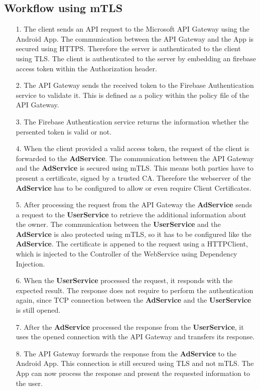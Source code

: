 \subsection{Workflow using mTLS}
\begin{enumerate}
	\item[1.] The client sends an API request to the Microsoft API Gateway using the Android App.
		The communication between the API Gateway and the App is secured using HTTPS.
		Therefore the server is authenticated to the client using TLS.
		The client is authenticated to the server by embedding an firebase access token within the Authorization header.
	\item[2.] The API Gateway sends the received token to the Firebase Authentication service to validate it.
		This is defined as a policy within the policy file of the API Gateway.
	\item[3.] The Firebase Authentication service returns the information whether the persented token is valid or not.
	\item[4.] When the client provided a valid access token, the request of the client is forwarded to the \textbf{AdService}.
		The communication between the API Gateway and the \textbf{AdService} is secured using mTLS.
		This means both parties have to present a certificate, signed by a trusted CA.
		Therefore the webserver of the \textbf{AdService} has to be configured to allow or even require Client Certificates.
	\item[5.] After processing the request from the API Gateway the \textbf{AdService} sends a request to the \textbf{UserService} to retrieve the additional information about the owner.
		The communication between the \textbf{UserService} and the \textbf{AdService} is also protected using mTLS, so it has to be configured like the \textbf{AdService}.
		The certificate is appened to the request using a HTTPClient, which is injected to the Controller of the WebService using Dependency Injection.
	\item[6.] When the \textbf{UserService} processed the request, it responds with the expected result.
		The response does not require to perform the authentication again, since TCP connection between the \textbf{AdService} and the \textbf{UserService} is still opened.
	\item[7.] After the \textbf{AdService} processed the response from the \textbf{UserService}, it uses the opened connection with the API Gateway and transfers its response.
	\item[8.] The API Gateway forwards the response from the \textbf{AdService} to the Android App.
		This connection is still secured using TLS and not mTLS.
		The App can now process the response and present the requested information to the user.
\end{enumerate}

